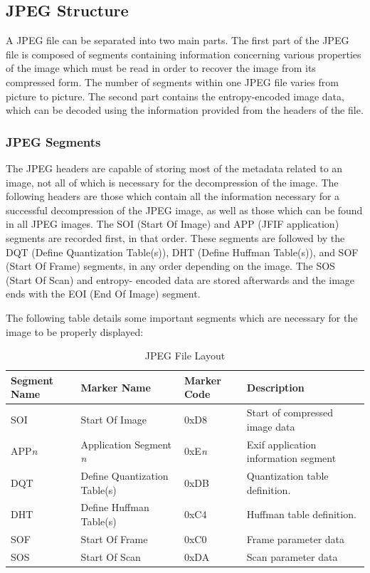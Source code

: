 \subsection{JPEG Structure}
A JPEG file can be separated into two main parts. 
The first part of the JPEG file is composed of segments containing information concerning 
various properties of the image which must be read in order to recover the image from its compressed form. 
The number of segments within one JPEG file varies from picture to picture.
The second part contains the entropy-encoded image data, which can be decoded using the information provided from the headers of the file.  

\subsubsection{JPEG Segments}
The JPEG headers are capable of storing most of the metadata related to an image, not all of which is necessary for the decompression of the image. 
The following headers are those which contain all the information necessary for 
a successful decompression of the JPEG image, as well as those which can be found in all JPEG images.
The SOI (Start Of Image) and APP (JFIF application) segments are recorded first, in that order.
These segments are followed by the DQT (Define Quantization Table(s)), DHT (Define Huffman Table(s)), and SOF (Start Of Frame) segments,
in any order depending on the image. The SOS (Start Of Scan) and entropy- encoded data are 
stored afterwards and the image ends with the EOI (End Of Image) segment.

The following table details some important segments which are necessary for the image
to be properly displayed: \cite{exif_std}

\begin{table}[!hbtp]
	\caption{JPEG File Layout}
	\centering
	\begin{tabular}{ | p{1.5cm} | p{3cm} | p{2cm} | p{2.8cm} | }
	\hline
	\textbf{Segment Name} & \textbf{Marker Name} & 
	\textbf{Marker Code} & \textbf{Description} \\ \hline
	SOI & Start Of Image & 0xD8 & Start of compressed image data\\ \hline
	APP\emph{n} & Application Segment \emph{n} & 0xE\emph{n} & Exif application information segment\\ \hline
	DQT & Define Quantization Table(s) & 0xDB & Quantization table definition.\\ \hline
	DHT & Define Huffman Table(s) & 0xC4 & Huffman table definition.\\ \hline
	SOF & Start Of Frame & 0xC0 & Frame parameter data\\ \hline
	SOS & Start Of Scan & 0xDA & Scan parameter data\\ \hline
	\end{tabular}
\end{table}

